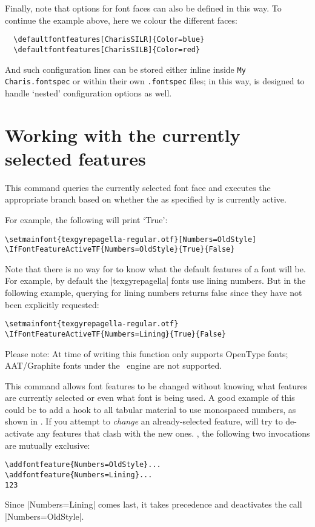 Finally, note that options for font faces can also be defined in this way.
To continue the example above, here we colour the different faces:
\begin{Verbatim}
  \defaultfontfeatures[CharisSILR]{Color=blue}
  \defaultfontfeatures[CharisSILB]{Color=red}
\end{Verbatim}
And such configuration lines can be stored either inline inside \texttt{My Charis.fontspec} or within their own \texttt{.fontspec} files; in this way,  is designed to handle `nested' configuration options as well.

\section{Working with the currently selected features}
\label{sec:addfontfeatures}



This command queries the currently selected font face and executes the appropriate branch based on whether the  as specified by  is currently active.

For example, the following will print `True':
\begin{Verbatim}
\setmainfont{texgyrepagella-regular.otf}[Numbers=OldStyle]
\IfFontFeatureActiveTF{Numbers=OldStyle}{True}{False}
\end{Verbatim}

Note that there is no way for  to know what the default features of a font will be. For example, by default the |texgyrepagella| fonts use lining numbers. But in the following example, querying for lining numbers returns false since they have not been explicitly requested:
\begin{Verbatim}
\setmainfont{texgyrepagella-regular.otf}
\IfFontFeatureActiveTF{Numbers=Lining}{True}{False}
\end{Verbatim}

Please note: At time of writing this function only supports OpenType fonts; AAT/Graphite fonts under the \XeTeX\ engine are not supported.



This command allows font features to
be changed without knowing what features are currently selected or even what
font is being used. A good example of this could be to add a hook to all
tabular material to use monospaced numbers, as shown in .
If you attempt to \emph{change} an already-selected feature,  will try to de-activate any features that clash with the new ones.
\Eg, the following two invocations are mutually exclusive:
\begin{Verbatim}
\addfontfeature{Numbers=OldStyle}...
\addfontfeature{Numbers=Lining}...
123
\end{Verbatim}
Since |Numbers=Lining| comes last, it takes precedence and deactivates the call |Numbers=OldStyle|.

